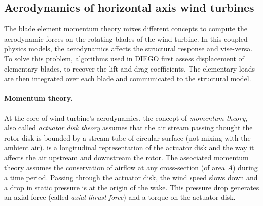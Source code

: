 \subsection{Aerodynamics of horizontal axis wind turbines}

The blade element momentum theory mixes different concepts to compute the aerodynamic forces on the rotating blades of the wind turbine. 
In this coupled physics models, the aerodynamics affects the structural response and vise-versa. 
To solve this problem, algorithms used in DIEGO first assess displacement of elementary blades, to recover the lift and drag coefficients. 
The elementary loads are then integrated over each blade and communicated to the structural model.


\paragraph{Momentum theory.}
At the core of wind turbine's aerodynamics, the concept of \textit{momentum theory}, also called \textit{actuator disk theory} assumes that the air stream passing thought the rotor disk is bounded by a stream tube of circular surface (not mixing with the ambient air). 
 is a longitudinal representation of the actuator disk and the way it affects the air upstream and downstream the rotor. 
The associated momentum theory assumes the conservation of airflow at any cross-section (of area $A$) during a time period. 
Passing through the actuator disk, the wind speed slows down and a drop in static pressure is at the origin of the wake. 
This pressure drop generates an axial force (called \textit{axial thrust force}) and a torque on the actuator disk.

